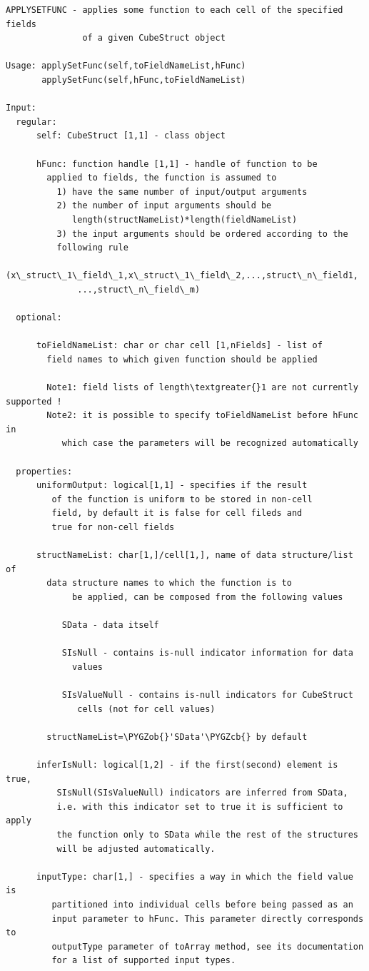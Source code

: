 \documentclass[letterpaper,10pt,english]{sphinxmanual}
\def\PYGZob{\char`\{}
\def\PYGZcb{\char`\}}
\begin{document}
\label{chap_func:smartdb-relations-atypifiedstaticrelation-applysetfunc}
\begin{Verbatim}[commandchars=\\\{\}]
APPLYSETFUNC - applies some function to each cell of the specified fields
               of a given CubeStruct object

Usage: applySetFunc(self,toFieldNameList,hFunc)
       applySetFunc(self,hFunc,toFieldNameList)

Input:
  regular:
      self: CubeStruct [1,1] - class object

      hFunc: function handle [1,1] - handle of function to be
        applied to fields, the function is assumed to
          1) have the same number of input/output arguments
          2) the number of input arguments should be
             length(structNameList)*length(fieldNameList)
          3) the input arguments should be ordered according to the
          following rule
              (x\_struct\_1\_field\_1,x\_struct\_1\_field\_2,...,struct\_n\_field1,
              ...,struct\_n\_field\_m)

  optional:

      toFieldNameList: char or char cell [1,nFields] - list of
        field names to which given function should be applied

        Note1: field lists of length\textgreater{}1 are not currently supported !
        Note2: it is possible to specify toFieldNameList before hFunc in
           which case the parameters will be recognized automatically

  properties:
      uniformOutput: logical[1,1] - specifies if the result
         of the function is uniform to be stored in non-cell
         field, by default it is false for cell fileds and
         true for non-cell fields

      structNameList: char[1,]/cell[1,], name of data structure/list of
        data structure names to which the function is to
             be applied, can be composed from the following values

           SData - data itself

           SIsNull - contains is-null indicator information for data
             values

           SIsValueNull - contains is-null indicators for CubeStruct
              cells (not for cell values)

        structNameList=\PYGZob{}'SData'\PYGZcb{} by default

      inferIsNull: logical[1,2] - if the first(second) element is true,
          SIsNull(SIsValueNull) indicators are inferred from SData,
          i.e. with this indicator set to true it is sufficient to apply
          the function only to SData while the rest of the structures
          will be adjusted automatically.

      inputType: char[1,] - specifies a way in which the field value is
         partitioned into individual cells before being passed as an
         input parameter to hFunc. This parameter directly corresponds to
         outputType parameter of toArray method, see its documentation
         for a list of supported input types.
\end{Verbatim}
\end{document}
